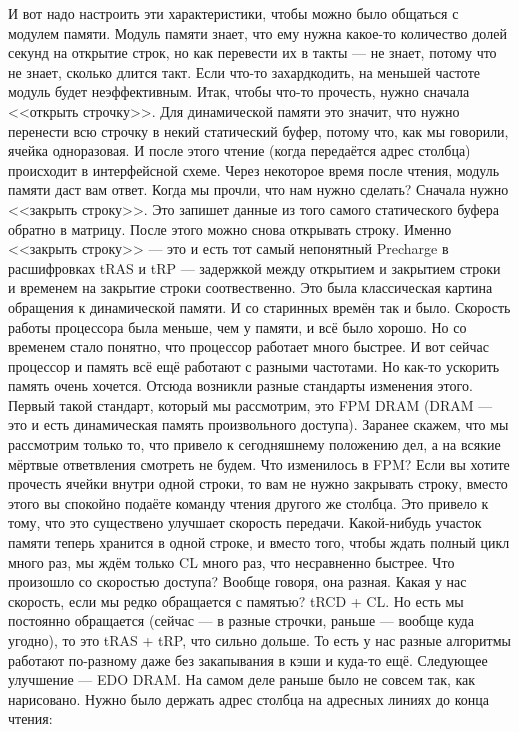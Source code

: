 \documentclass{article}
\begin{document}
    И вот надо настроить эти характеристики, чтобы можно было общаться с модулем памяти. Модуль памяти знает, что ему нужна какое-то количество долей секунд на открытие строк, но как перевести их в такты --- не знает, потому что не знает, сколько длится такт. Если что-то захардкодить, на меньшей частоте модуль будет неэффективным. Итак, чтобы что-то прочесть, нужно сначала <<открыть строчку>>. Для динамической памяти это значит, что нужно перенести всю строчку в некий статический буфер, потому что, как мы говорили, ячейка одноразовая. И после этого чтение (когда передаётся адрес столбца) происходит в интерфейсной схеме. Через некоторое время после чтения, модуль памяти даст вам ответ. Когда мы прочли, что нам нужно сделать? Сначала нужно <<закрыть строку>>. Это запишет данные из того самого статического буфера обратно в матрицу. После этого можно снова открывать строку. Именно <<закрыть строку>> --- это и есть тот самый непонятный Precharge в расшифровках tRAS и tRP --- задержкой между открытием и закрытием строки и временем на закрытие строки соотвественно. Это была классическая картина обращения к динамической памяти. И со старинных времён так и было. Скорость работы процессора была меньше, чем у памяти, и всё было хорошо. Но со временем стало понятно, что процессор работает много быстрее. И вот сейчас процессор и память всё ещё работают с разными частотами. Но как-то ускорить память очень хочется. Отсюда возникли разные стандарты изменения этого. Первый такой стандарт, который мы рассмотрим, это FPM DRAM (DRAM --- это и есть динамическая память произвольного доступа). Заранее скажем, что мы рассмотрим только то, что привело к сегодняшнему положению дел, а на всякие мёртвые ответвления смотреть не будем. Что изменилось в FPM? Если вы хотите прочесть ячейки внутри одной строки, то вам не нужно закрывать строку, вместо этого вы спокойно подаёте команду чтения другого же столбца. Это привело к тому, что это существено улучшает скорость передачи. Какой-нибудь участок памяти теперь хранится в одной строке, и вместо того, чтобы ждать полный цикл много раз, мы ждём только CL много раз, что несравненно быстрее. Что произошло со скоростью доступа? Вообще говоря, она разная. Какая у нас скорость, если мы редко обращается с памятью? tRCD + CL. Но есть мы постоянно обращается (сейчас --- в разные строчки, раньше --- вообще куда угодно), то это tRAS + tRP, что сильно дольше. То есть у нас разные алгоритмы работают по-разному даже без закапывания в кэши и куда-то ещё. Следующее улучшение --- EDO DRAM. На самом деле раньше было не совсем так, как нарисовано. Нужно было держать адрес столбца на адресных линиях до конца чтения:
\end{document}
